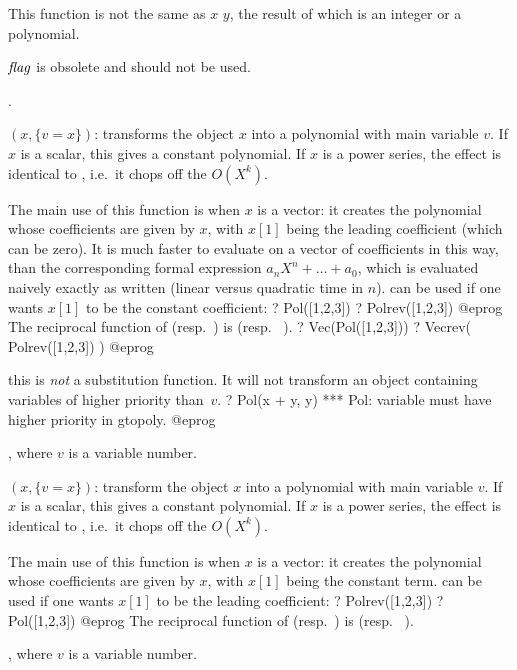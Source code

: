 This function is not the same as $x$ \kbd{\%} $y$, the result of which is an
integer or a polynomial.

$\hbox{\it f\kern0pt lag\/}$ is obsolete and should not be used.

.

$(x,\{v=x\})$: transforms the object $x$ into a polynomial with
main variable $v$. If $x$ is a scalar, this gives a constant polynomial. If
$x$ is a power series, the effect is identical to ,
i.e.~it chops off the $O(X^k)$. 

The main use of this function is when $x$ is a vector: it creates the
polynomial whose coefficients are given by $x$, with $x[1]$ being the leading
coefficient (which can be zero). It is much faster to evaluate
 on a vector of coefficients in this way, than the corresponding
formal expression $a_n X^n + \dots + a_0$, which is evaluated naively exactly
as written (linear versus quadratic time in $n$).  can be used if
one wants $x[1]$ to be the constant coefficient:
\bprog
? Pol([1,2,3])
? Polrev([1,2,3])
@eprog\noindent
The reciprocal function of  (resp.~) is  (resp.~
).
\bprog
? Vec(Pol([1,2,3]))
? Vecrev( Polrev([1,2,3]) )
@eprog\noindent

 this is \emph{not} a substitution function. It will not
transform an object containing variables of higher priority than~$v$.
\bprog
? Pol(x + y, y)
  *** Pol: variable must have higher priority in gtopoly.
@eprog

, where $v$ is a variable number.

$(x,\{v=x\})$: transform the object $x$ into a polynomial
with main variable $v$. If $x$ is a scalar, this gives a constant polynomial.
If $x$ is a power series, the effect is identical to , i.e.~it
chops off the $O(X^k)$.

The main use of this function is when $x$ is a vector: it creates the
polynomial whose coefficients are given by $x$, with $x[1]$ being the
constant term.  can be used if one wants $x[1]$ to be the leading
coefficient:
\bprog
? Polrev([1,2,3])
? Pol([1,2,3])
@eprog
The reciprocal function of  (resp.~) is  (resp.~
).

, where $v$ is a variable number.

